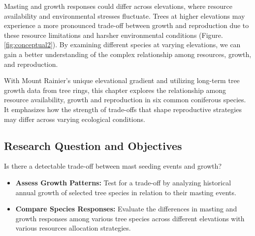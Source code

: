 \documentclass[11pt,letter]{article}
\begin{document}
Masting and growth responses could differ across elevations, where resource availability and environmental stresses fluctuate. Trees at higher elevations may experience a more pronounced trade-off between growth and reproduction due to these resource limitations and harsher environmental conditions (Figure. \ref{fig:conceptual2}). By examining different species at varying elevations, we can gain a better understanding of the complex relationship among resources, growth, and reproduction.\par
With Mount Rainier's unique elevational gradient and utilizing long-term tree growth data from tree rings, this chapter explores the relationship among resource availability, growth and reproduction in six common coniferous species. It emphasizes how the strength of trade-offs that shape reproductive strategies may differ across varying ecological conditions.   %
\subsection{Research Question and Objectives}
Is there a detectable trade-off between mast seeding events and growth?
	\begin{itemize}
	\item \textbf{Assess Growth Patterns:} Test for a trade-off by analyzing historical annual growth of selected tree species in relation to their masting events.
	\item \textbf{Compare Species Responses:} Evaluate the differences in masting and growth responses among various tree species across different elevations with various resources allocation strategies.
	\end{itemize}
\end{document}
